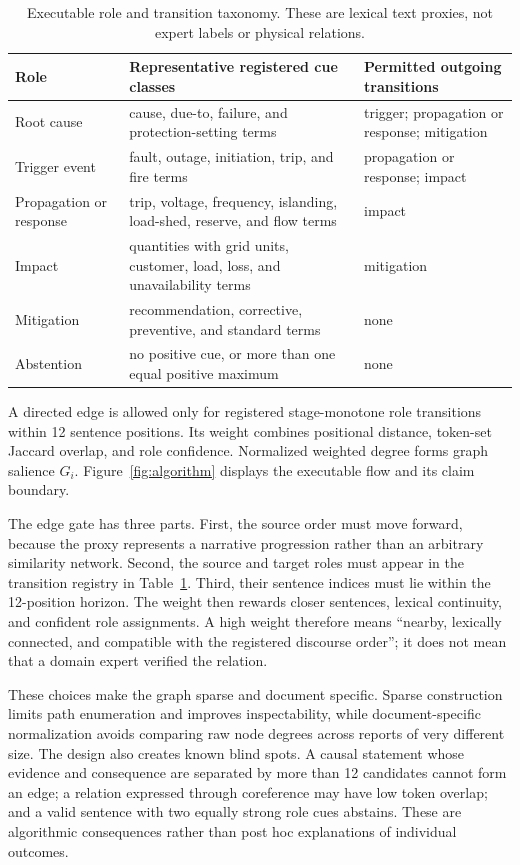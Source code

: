 \documentclass[applsci,article,submit,moreauthors]{Definitions/mdpi}
\begin{document}
\begin{table}[H]
\caption{Executable role and transition taxonomy. These are lexical text proxies, not expert labels or physical relations.}
\label{tab:taxonomy}\centering\small
\begin{tabularx}{\textwidth}{p{2.2cm}XX}
\toprule
Role & Representative registered cue classes & Permitted outgoing transitions\\
\midrule
Root cause & cause, due-to, failure, and protection-setting terms & trigger; propagation or response; mitigation\\
Trigger event & fault, outage, initiation, trip, and fire terms & propagation or response; impact\\
Propagation or response & trip, voltage, frequency, islanding, load-shed, reserve, and flow terms & impact\\
Impact & quantities with grid units, customer, load, loss, and unavailability terms & mitigation\\
Mitigation & recommendation, corrective, preventive, and standard terms & none\\
Abstention & no positive cue, or more than one equal positive maximum & none\\
\bottomrule
\end{tabularx}
\end{table}

A directed edge is allowed only for registered stage-monotone role transitions within 12 sentence positions. Its weight combines positional distance, token-set Jaccard overlap, and role confidence. Normalized weighted degree forms graph salience $G_i$. Figure~\ref{fig:algorithm} displays the executable flow and its claim boundary.

The edge gate has three parts. First, the source order must move forward, because the proxy represents a narrative progression rather than an arbitrary similarity network. Second, the source and target roles must appear in the transition registry in Table~\ref{tab:taxonomy}. Third, their sentence indices must lie within the 12-position horizon. The weight then rewards closer sentences, lexical continuity, and confident role assignments. A high weight therefore means ``nearby, lexically connected, and compatible with the registered discourse order''; it does not mean that a domain expert verified the relation.

These choices make the graph sparse and document specific. Sparse construction limits path enumeration and improves inspectability, while document-specific normalization avoids comparing raw node degrees across reports of very different size. The design also creates known blind spots. A causal statement whose evidence and consequence are separated by more than 12 candidates cannot form an edge; a relation expressed through coreference may have low token overlap; and a valid sentence with two equally strong role cues abstains. These are algorithmic consequences rather than post hoc explanations of individual outcomes.
\end{document}
